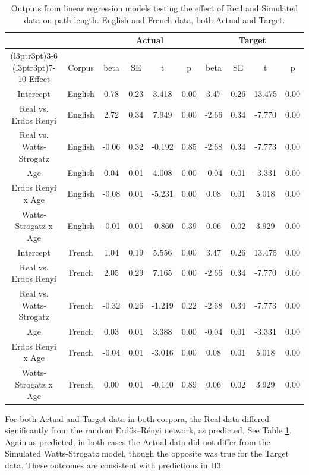\documentclass[
  english,
  man,floatsintext]{apa6}
\begin{document}
\begin{longtable}[t]{cccccccccc}
\caption{\label{tab:table-pathlength}Outputs from linear regression models testing the effect of Real and Simulated data on path length. English and French data, both Actual and Target.}\\
\toprule
\multicolumn{2}{c}{ } & \multicolumn{4}{c}{Actual} & \multicolumn{4}{c}{Target} \\
\cmidrule(l{3pt}r{3pt}){3-6} \cmidrule(l{3pt}r{3pt}){7-10}
Effect & Corpus & beta & SE & t & p & beta & SE & t & p\\
\midrule
Intercept & English & 0.78 & 0.23 & 3.418 & 0.00 & 3.47 & 0.26 & 13.475 & 0.00\\
Real vs. Erdos Renyi & English & 2.72 & 0.34 & 7.949 & 0.00 & -2.66 & 0.34 & -7.770 & 0.00\\
Real vs. Watts-Strogatz & English & -0.06 & 0.32 & -0.192 & 0.85 & -2.68 & 0.34 & -7.773 & 0.00\\
Age & English & 0.04 & 0.01 & 4.008 & 0.00 & -0.04 & 0.01 & -3.331 & 0.00\\
Erdos Renyi x Age & English & -0.08 & 0.01 & -5.231 & 0.00 & 0.08 & 0.01 & 5.018 & 0.00\\
\addlinespace
Watts-Strogatz x Age & English & -0.01 & 0.01 & -0.860 & 0.39 & 0.06 & 0.02 & 3.929 & 0.00\\
Intercept & French & 1.04 & 0.19 & 5.556 & 0.00 & 3.47 & 0.26 & 13.475 & 0.00\\
Real vs. Erdos Renyi & French & 2.05 & 0.29 & 7.165 & 0.00 & -2.66 & 0.34 & -7.770 & 0.00\\
Real vs. Watts-Strogatz & French & -0.32 & 0.26 & -1.219 & 0.22 & -2.68 & 0.34 & -7.773 & 0.00\\
Age & French & 0.03 & 0.01 & 3.388 & 0.00 & -0.04 & 0.01 & -3.331 & 0.00\\
\addlinespace
Erdos Renyi x Age & French & -0.04 & 0.01 & -3.016 & 0.00 & 0.08 & 0.01 & 5.018 & 0.00\\
Watts-Strogatz x Age & French & 0.00 & 0.01 & -0.140 & 0.89 & 0.06 & 0.02 & 3.929 & 0.00\\
\bottomrule
\end{longtable}

For both Actual and Target data in both corpora, the Real data differed significantly from the random Erdős--Rényi network, as predicted. See Table \ref{tab:table-pathlength}. Again as predicted, in both cases the Actual data did not differ from the Simulated Watts-Strogatz model, though the opposite was true for the Target data. These outcomes are consistent with predictions in H3.
\end{document}
